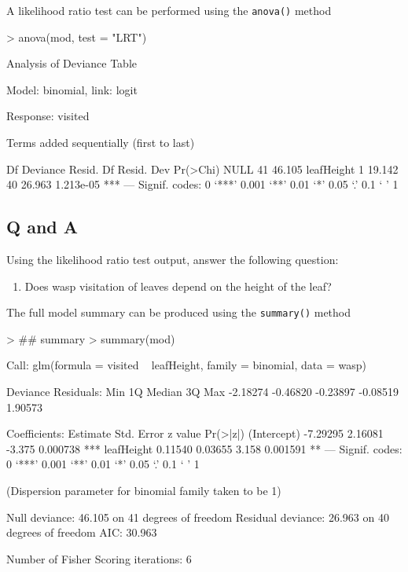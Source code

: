 \documentclass[a4paper,10pt]{article}
\begin{document}
A likelihood ratio test can be performed using the \texttt{anova()} method

\begin{Schunk}
\begin{Sinput}
> anova(mod, test = "LRT")
\end{Sinput}
\begin{Soutput}
Analysis of Deviance Table

Model: binomial, link: logit

Response: visited

Terms added sequentially (first to last)


           Df Deviance Resid. Df Resid. Dev  Pr(>Chi)    
NULL                          41     46.105              
leafHeight  1   19.142        40     26.963 1.213e-05 ***
---
Signif. codes:  0 ‘***’ 0.001 ‘**’ 0.01 ‘*’ 0.05 ‘.’ 0.1 ‘ ’ 1
\end{Soutput}
\end{Schunk}

\subsection*{Q and A}
Using the likelihood ratio test output, answer the following question:

\begin{enumerate}
\item Does wasp visitation of leaves depend on the height of the leaf?
\end{enumerate}

The full model summary can be produced using the \texttt{summary()} method

\begin{Schunk}
\begin{Sinput}
> ## summary
> summary(mod)
\end{Sinput}
\begin{Soutput}
Call:
glm(formula = visited ~ leafHeight, family = binomial, data = wasp)

Deviance Residuals: 
     Min        1Q    Median        3Q       Max  
-2.18274  -0.46820  -0.23897  -0.08519   1.90573  

Coefficients:
            Estimate Std. Error z value Pr(>|z|)    
(Intercept) -7.29295    2.16081  -3.375 0.000738 ***
leafHeight   0.11540    0.03655   3.158 0.001591 ** 
---
Signif. codes:  0 ‘***’ 0.001 ‘**’ 0.01 ‘*’ 0.05 ‘.’ 0.1 ‘ ’ 1

(Dispersion parameter for binomial family taken to be 1)

    Null deviance: 46.105  on 41  degrees of freedom
Residual deviance: 26.963  on 40  degrees of freedom
AIC: 30.963

Number of Fisher Scoring iterations: 6
\end{Soutput}
\end{Schunk}
\end{document}
